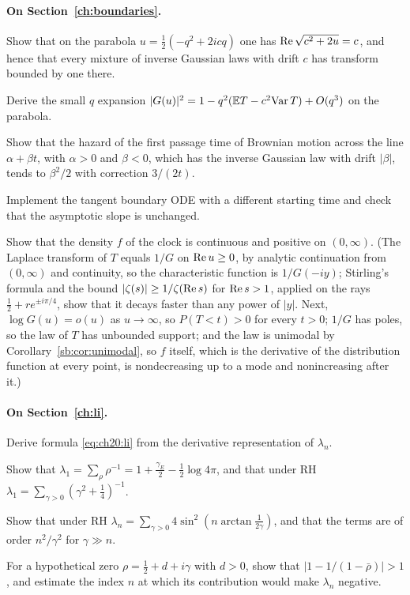 \paragraph{On Section~\ref{ch:boundaries}.}
\begin{exercises}
\item Show that on the parabola $u=\frac12(-q^2+2icq)$ one has $\operatorname{Re}\sqrt{c^2+2u}=c$, and hence that every mixture of inverse Gaussian laws with drift $c$ has transform bounded by one there.
\item Derive the small $q$ expansion $|G(u)|^2=1-q^2(\mathbb{E} T-c^2\mathrm{Var}\,T)+O(q^3)$ on the parabola.
\item\label{ex:ch19:ig} Show that the hazard of the first passage time of Brownian motion across the line $\alpha+\beta t$, with $\alpha>0$ and $\beta<0$, which has the inverse Gaussian law with drift $|\beta|$, tends to $\beta^2/2$ with correction $3/(2t)$.
\item Implement the tangent boundary ODE with a different starting time and check that the asymptotic slope is unchanged.
\item\label{ex:ch19:density} Show that the density $f$ of the clock is continuous and positive on $(0,\infty)$. (The Laplace transform of $T$ equals $1/G$ on $\operatorname{Re} u\ge0$, by analytic continuation from $(0,\infty)$ and continuity, so the characteristic function is $1/G(-iy)$; Stirling's formula and the bound $|\zeta(s)|\ge1/\zeta(\operatorname{Re} s)$ for $\operatorname{Re} s>1$, applied on the rays $\frac12+re^{\pm i\pi/4}$, show that it decays faster than any power of $|y|$. Next, $\log G(u)=o(u)$ as $u\to\infty$, so $P(T<t)>0$ for every $t>0$; $1/G$ has poles, so the law of $T$ has unbounded support; and the law is unimodal by Corollary~\ref{sb:cor:unimodal}, so $f$ itself, which is the derivative of the distribution function at every point, is nondecreasing up to a mode and nonincreasing after it.)
\end{exercises}

\paragraph{On Section~\ref{ch:li}.}
\begin{exercises}
\item Derive formula \eqref{eq:ch20:li} from the derivative representation of $\lambda_n$.
\item Show that $\lambda_1=\sum_\rho\rho^{-1}=1+\frac{\gamma_E}2-\frac12\log4\pi$, and that under RH $\lambda_1=\sum_{\gamma>0}(\gamma^2+\frac14)^{-1}$.
\item Show that under RH $\lambda_n=\sum_{\gamma>0}4\sin^2(n\arctan\frac1{2\gamma})$, and that the terms are of order $n^2/\gamma^2$ for $\gamma\gg n$.
\item\label{ex:ch20:offline} For a hypothetical zero $\rho=\frac12+d+i\gamma$ with $d>0$, show that $|1-1/(1-\bar\rho)|>1$, and estimate the index $n$ at which its contribution would make $\lambda_n$ negative.
\end{exercises}


